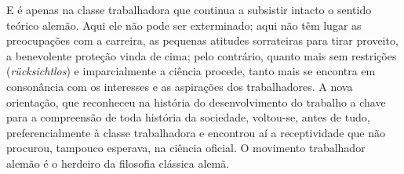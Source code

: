 E é apenas na classe trabalhadora que continua a subsistir intacto o
sentido teórico alemão. Aqui ele não pode ser exterminado; aqui não têm
lugar as preocupações com a carreira, as pequenas atitudes sorrateiras
para tirar proveito, a benevolente proteção vinda de cima; pelo
contrário, quanto mais sem restrições (\emph{rücksichtlos}) e
imparcialmente a ciência procede, tanto mais se encontra em consonância
com os interesses e as aspirações dos trabalhadores. A nova orientação,
que reconheceu na história do desenvolvimento do trabalho a chave para a
compreensão de toda história da sociedade, voltou-se, antes de tudo,
preferencialmente à classe trabalhadora e encontrou aí a receptividade
que não procurou, tampouco esperava, na ciência oficial. O movimento
trabalhador alemão é o herdeiro da filosofia clássica alemã.
